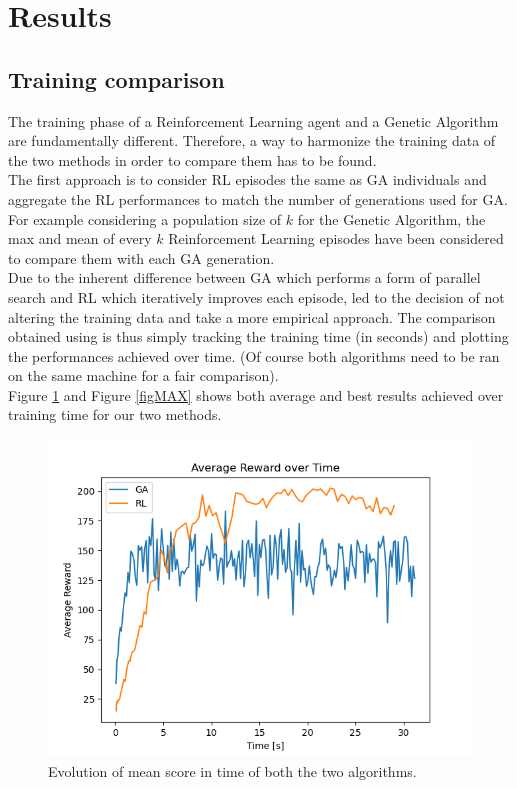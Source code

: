\section{Results}

\subsection{Training comparison}

The training phase of a Reinforcement Learning agent and a Genetic Algorithm are fundamentally different.
Therefore, a way to harmonize the training data of the two methods in order to compare them has to be found.
\\
The first approach is to consider RL episodes the same as GA individuals and aggregate the RL performances to match the number of generations used for GA.
For example considering a population size of $k$ for the Genetic Algorithm, the max and mean of every $k$ Reinforcement Learning episodes have been considered to compare them with each GA generation.
\\
Due to the inherent difference between GA which performs a form of parallel search and RL which iteratively improves each episode, led to the decision of not altering the training data and take a more empirical approach.
The comparison obtained using is thus simply tracking the training time (in seconds) and plotting the performances achieved over time. (Of course both algorithms need to be ran on the same machine for a fair comparison).
\\
Figure \ref{figAVG} and Figure \ref{figMAX} shows both average and best results achieved over training time for our two methods.

\begin{figure}[H]
	\centering
	\includegraphics [scale = 0.5]{Images/RL_GA_comparison_avg.png}
	\caption{Evolution of mean score in time of both the two algorithms.}
	\label{figAVG}
\end{figure}

